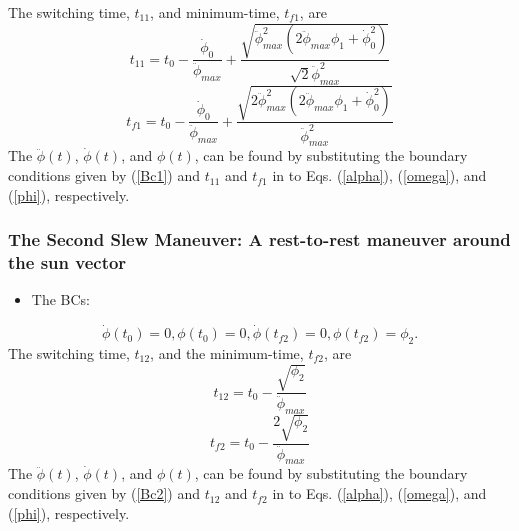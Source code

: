 \documentclass[letterpaper, preprint, paper,11pt]{AAS}	%
\begin{document}
	The switching time, $t_{11}$, and minimum-time, $t_{f1}$, are
	\begin{equation}\label{t11}
	t_{11}=t_0-\frac{\dot{\phi}_0}{\ddot{\phi}_{max}}+\frac{\sqrt{\ddot{\phi}_{max}^2(2\ddot{\phi}_{max}\phi_1+\dot{\phi}_{0}^2)}}{\sqrt{2}\ddot{\phi}_{max}^2}
	\end{equation}
	\begin{equation}\label{tf1}
	t_{f1}=t_0-\frac{\dot{\phi}_0}{\ddot{\phi}_{max}}+\frac{\sqrt{2\ddot{\phi}_{max}^2(2\ddot{\phi}_{max}\phi_1+\dot{\phi}_{0}^2)}}{\ddot{\phi}_{max}^2}
	\end{equation}
	The $\ddot{\phi}(t)$, $\dot{\phi}(t)$, and  $\phi(t)$,  can be found by substituting the boundary conditions given by (\ref{Bc1}) and $t_{11}$ and $t_{f1}$ in to Eqs. (\ref{alpha}), (\ref{omega}), and (\ref{phi}), respectively.
	
	
	\subsubsection{The Second Slew Maneuver: A rest-to-rest maneuver around the sun vector} 
	
	\begin{itemize}
		\item The BCs: 
	\end{itemize}
	\begin{equation}\label{Bc2}
	\dot{\phi}(t_0)=0,\phi(t_0)=0, \dot{\phi}(t_{f2})=0,\phi(t_{f2})=\phi_2.
	\end{equation}
	The switching time, $t_{12}$, and the minimum-time, $t_{f2}$, are
	\begin{equation}\label{t21}
	t_{12}=t_0-\frac{\sqrt{\phi_2}}{\ddot{\phi}_{max}}
	\end{equation}
	\begin{equation}\label{tf2}
	t_{f2}=t_0-\frac{2\sqrt{\phi_2}}{\ddot{\phi}_{max}}
	\end{equation}
	The $\ddot{\phi}(t)$, $\dot{\phi}(t)$, and  $\phi(t)$,  can be found by substituting the boundary conditions given by (\ref{Bc2}) and $t_{12}$ and $t_{f2}$ in to Eqs. (\ref{alpha}), (\ref{omega}), and (\ref{phi}), respectively.
	
	
\end{document}
